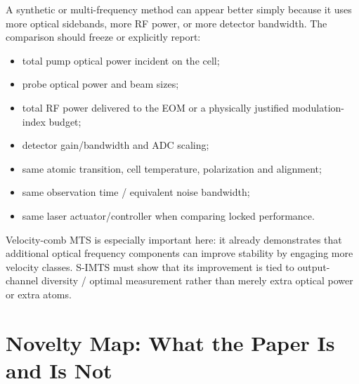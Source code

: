 \documentclass[10pt]{article}
\begin{document}
A synthetic or multi-frequency method can appear better simply because it uses more optical sidebands, more RF power, or more detector bandwidth. The comparison should freeze or explicitly report:
\begin{itemize}
\item total pump optical power incident on the cell;
\item probe optical power and beam sizes;
\item total RF power delivered to the EOM or a physically justified modulation-index budget;
\item detector gain/bandwidth and ADC scaling;
\item same atomic transition, cell temperature, polarization and alignment;
\item same observation time / equivalent noise bandwidth;
\item same laser actuator/controller when comparing locked performance.
\end{itemize}
Velocity-comb MTS is especially important here: it already demonstrates that additional optical frequency components can improve stability by engaging more velocity classes. S-IMTS must show that its improvement is tied to output-channel diversity / optimal measurement rather than merely extra optical power or extra atoms.

\section{Novelty Map: What the Paper Is and Is Not}
\end{document}
